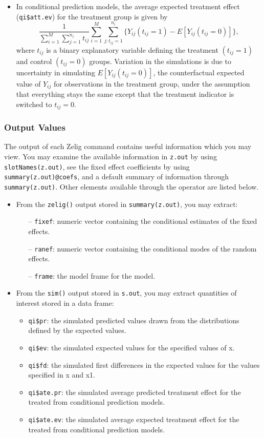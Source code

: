\begin{itemize}
\item In conditional prediction models, the average expected treatment effect ({\tt qi\$att.ev}) for the treatment group is given by
\begin{equation*}
\frac{1}{\sum_{i = 1}^M \sum_{j = 1}^{n_i} t_{ij}} \sum_{i = 1}^M \sum_{j:t_{ij} = 1}^{n_i} \{ Y_{ij} (t_{ij} = 1) - E[Y_{ij}(t_{ij} = 0)] \},
\end{equation*}
where $t_{ij}$ is a binary explanatory variable defining the treatment $(t_{ij} = 1)$ and control $(t_{ij} = 0)$ groups. Variation in the simulations is due to uncertainty in simulating $E[Y_{ij}(t_{ij} = 0)]$, the counterfactual expected value of $Y_{ij}$ for observations in the treatment group, under the assumption that everything stays the same except that the treatment indicator is switched to $t_{ij} = 0$.

\end{itemize}

\subsubsection{Output Values}
The output of each Zelig command contains useful information which you may view. You may examine the available information in {\tt z.out} by using {\tt slotNames(z.out)}, see the fixed effect coefficients by using {\tt summary(z.out)@coefs}, and a default summary of information through {\tt summary(z.out)}. Other elements available through the {\tt \@} operator are listed below.
\begin{itemize}
\item From the {\tt zelig()} output stored in {\tt summary(z.out)}, you may extract:
\begin{itemize}
\item[--] {\tt fixef}: numeric vector containing the conditional estimates of the fixed effects.
\item[--] {\tt ranef}: numeric vector containing the conditional modes of the random effects.
\item[--] {\tt frame}: the model frame for the model.
\end{itemize}
\item From the {\tt sim()} output stored in {\tt s.out}, you may extract quantities of interest stored in a data frame:
\begin{itemize}
\item {\tt qi\$pr}: the simulated predicted values drawn from the distributions defined by the expected values.
\item {\tt qi\$ev}: the simulated expected values for the specified values of x.
\item {\tt qi\$fd}: the simulated first differences in the expected values for the values specified in x and x1.
\item {\tt qi\$ate.pr}: the simulated average predicted treatment effect for the treated from conditional prediction models.
\item {\tt qi\$ate.ev}: the simulated average expected treatment effect for the treated from conditional prediction models.
\end{itemize}
\end{itemize}


